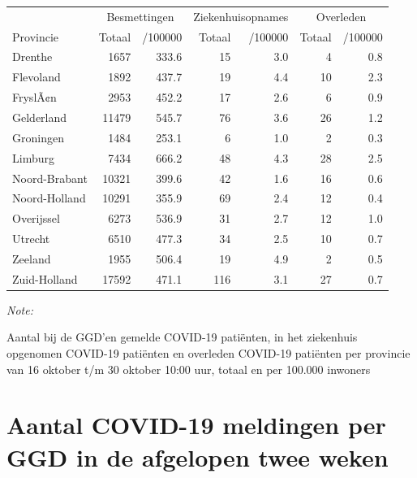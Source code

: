 \documentclass[
  english,
  man,floatsintext]{apa6}
\begin{document}
\begin{table}
\centering
\begin{threeparttable}
\begin{tabular}{lrrrrrr}
\toprule
\multicolumn{1}{c}{ } & \multicolumn{2}{c}{Besmettingen} & \multicolumn{2}{c}{Ziekenhuisopnames} & \multicolumn{2}{c}{Overleden} \\
\cmidrule(l{3pt}r{3pt}){2-3} \cmidrule(l{3pt}r{3pt}){4-5} \cmidrule(l{3pt}r{3pt}){6-7}
Provincie & Totaal & /100000 & Totaal & /100000 & Totaal & /100000\\
\midrule
Drenthe & 1657 & 333.6 & 15 & 3.0 & 4 & 0.8\\
Flevoland & 1892 & 437.7 & 19 & 4.4 & 10 & 2.3\\
FryslÃ¢n & 2953 & 452.2 & 17 & 2.6 & 6 & 0.9\\
Gelderland & 11479 & 545.7 & 76 & 3.6 & 26 & 1.2\\
Groningen & 1484 & 253.1 & 6 & 1.0 & 2 & 0.3\\
Limburg & 7434 & 666.2 & 48 & 4.3 & 28 & 2.5\\
Noord-Brabant & 10321 & 399.6 & 42 & 1.6 & 16 & 0.6\\
Noord-Holland & 10291 & 355.9 & 69 & 2.4 & 12 & 0.4\\
Overijssel & 6273 & 536.9 & 31 & 2.7 & 12 & 1.0\\
Utrecht & 6510 & 477.3 & 34 & 2.5 & 10 & 0.7\\
Zeeland & 1955 & 506.4 & 19 & 4.9 & 2 & 0.5\\
Zuid-Holland & 17592 & 471.1 & 116 & 3.1 & 27 & 0.7\\
\bottomrule
\end{tabular}
\begin{tablenotes}
\item \textit{Note: } 
\item Aantal bij de GGD’en gemelde COVID-19 patiënten, in het ziekenhuis opgenomen COVID-19 patiënten en overleden COVID-19 patiënten per provincie van 16 oktober t/m 30 oktober 10:00 uur, totaal en per 100.000 inwoners
\end{tablenotes}
\end{threeparttable}
\end{table}

\newpage

\hypertarget{aantal-covid-19-meldingen-per-ggd-in-de-afgelopen-twee-weken}{%
\section{Aantal COVID-19 meldingen per GGD in de afgelopen twee weken}\label{aantal-covid-19-meldingen-per-ggd-in-de-afgelopen-twee-weken}}
\end{document}
